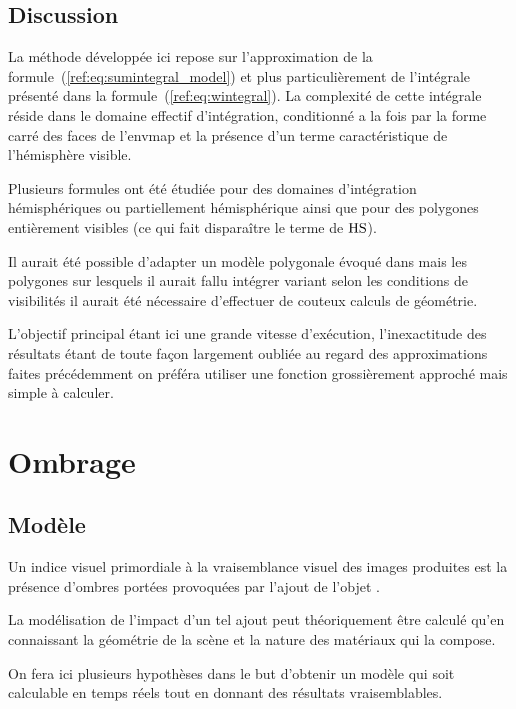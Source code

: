 \documentclass[10pt,a4paper,twoside, twocolumn]{report}
\begin{document}
\subsection{Discussion}

La méthode développée ici repose sur l'approximation de la formule~(\ref{ref:eq:sumintegral_model}) et plus particulièrement de l'intégrale présenté dans la formule~(\ref{ref:eq:wintegral}). La complexité de cette intégrale réside dans le domaine effectif d'intégration, conditionné a la fois par la forme carré des faces de l'envmap et la présence d'un terme caractéristique de l'hémisphère visible.

Plusieurs formules ont été étudiée pour des domaines d'intégration hémisphériques ou partiellement hémisphérique ainsi que pour des polygones entièrement visibles \cite{Snyder1996} (ce qui fait disparaître le terme de $\operatorname{HS}$).

Il aurait été possible d'adapter un modèle polygonale évoqué dans \cite{Snyder1996} mais les polygones sur lesquels il aurait fallu intégrer variant selon les conditions de visibilités il aurait été nécessaire d'effectuer de couteux calculs de géométrie.

L'objectif principal étant ici une grande vitesse d'exécution, l'inexactitude des résultats étant de toute façon largement oubliée au regard des approximations faites précédemment on préféra utiliser une fonction grossièrement approché mais simple à calculer.




\section{Ombrage}

\subsection{Modèle}

Un indice visuel primordiale à la vraisemblance visuel des images produites est la présence d'ombres portées provoquées par l'ajout de l'objet .

La modélisation de l'impact d'un tel ajout peut théoriquement être calculé qu'en connaissant la géométrie de la scène et la nature des matériaux qui la compose.

On fera ici plusieurs hypothèses dans le but d'obtenir un modèle qui soit calculable en temps réels tout en donnant des résultats vraisemblables.
\end{document}
